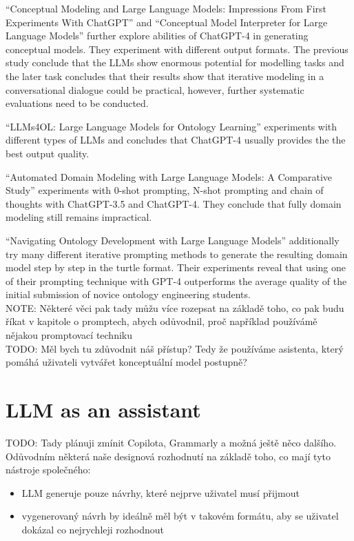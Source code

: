 ``Conceptual Modeling and Large Language Models: Impressions From First Experiments With ChatGPT'' \cite{Fill2023} and ``Conceptual Model Interpreter for Large Language Models'' \cite{Haerer2023} further explore abilities of ChatGPT-4 in generating conceptual models. They experiment with different output formats. The previous study conclude that the LLMs show enormous potential for modelling tasks and the later task concludes that their results show that iterative modeling in a conversational dialogue could be practical, however, further systematic evaluations need to be conducted.

``LLMs4OL: Large Language Models for Ontology Learning'' \cite{BabaeiGiglou2023} experiments with different types of LLMs and concludes that ChatGPT-4 usually provides the the best output quality.

``Automated Domain Modeling with Large Language Models: A Comparative Study'' \cite{Chen2023} experiments with 0-shot prompting, N-shot prompting and chain of thoughts with ChatGPT-3.5 and ChatGPT-4. They conclude that fully domain modeling still remains impractical.

``Navigating Ontology Development with Large Language Models'' \cite{Saeedizade2024} additionally try many different iterative prompting methods to generate the resulting domain model step by step in the turtle format. Their experiments reveal that using one of their prompting technique with GPT-4 outperforms the average quality of the initial submission of novice ontology engineering students. \\


NOTE: Některé věci pak tady můžu více rozepsat na základě toho, co pak budu říkat v kapitole o promptech, abych odůvodnil, proč například používámě nějakou promptovací techniku \\

TODO: Měl bych tu zdůvodnit náš přístup? Tedy že používáme asistenta, který pomáhá uživateli vytvářet konceptuální model postupně? \\


\section{LLM as an assistant}
TODO: Tady plánuji zmínit Copilota, Grammarly a možná ještě něco dalšího. Odůvodním některá naše designová rozhodnutí na základě toho, co mají tyto nástroje společného:

\begin{itemize}
\item LLM generuje pouze návrhy, které nejprve uživatel musí přijmout
\item vygenerovaný návrh by ideálně měl být v takovém formátu, aby se uživatel dokázal co nejrychleji rozhodnout \\
\end{itemize}



